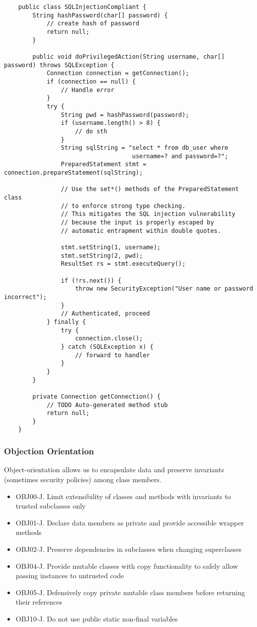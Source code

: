 \documentclass[a4paper]{article}
\begin{document}
\begin{verbatim}
	public class SQLInjectionCompliant {
		String hashPassword(char[] password) {
			// create hash of password
			return null;
		}
	
		public void doPrivilegedAction(String username, char[] password) throws SQLException {
			Connection connection = getConnection();
			if (connection == null) {
				// Handle error
			}
			try {
				String pwd = hashPassword(password);
				if (username.length() > 8) {
					// do sth
				}
				String sqlString = "select * from db_user where 
									username=? and password=?";
				PreparedStatement stmt = connection.prepareStatement(sqlString);
		
				// Use the set*() methods of the PreparedStatement class 
				// to enforce strong type checking.
				// This mitigates the SQL injection vulnerability 
				// because the input is properly escaped by
				// automatic entrapment within double quotes.
		
				stmt.setString(1, username);
				stmt.setString(2, pwd);
				ResultSet rs = stmt.executeQuery();
		
				if (!rs.next()) {
					throw new SecurityException("User name or password incorrect");
				}
				// Authenticated, proceed
			} finally {
				try {
					connection.close();
				} catch (SQLException x) {
					// forward to handler
				}
			}
		}
		
		private Connection getConnection() {
			// TODO Auto-generated method stub
			return null;
		}
	}
\end{verbatim}
\subsubsection{Objection Orientation}
Object-orientation allows us to encapsulate data and preserve invariants (sometimes security policies) among class members.
\begin{framed}
	\begin{displayquote}
		\begin{itemize}
			\item OBJ00-J. Limit extensibility of classes and methods with invariants to trusted subclasses only
			\item OBJ01-J. Declare data members as private and provide accessible wrapper methods
			\item OBJ02-J. Preserve dependencies in subclasses when changing superclasses
			\item OBJ04-J. Provide mutable classes with copy functionality to safely allow passing instances to untrusted code
			\item OBJ05-J. Defensively copy private mutable class members before returning their references
			\item OBJ10-J. Do not use public static non-final variables
		\end{itemize}
	\end{displayquote}
\end{framed}
\end{document}
